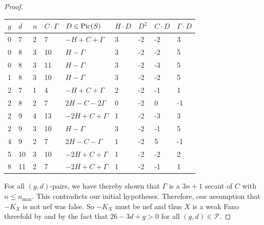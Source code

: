 \documentclass[english,11pt,reqno]{amsart}
\newcommand{\Pic}{\textup{Pic}}
\begin{document}
\begin{proof}
\begin{table}[H]
\label{table:finding_contradictory_divisors}
\begin{minipage}{\textwidth}
	\centering
	\vspace{0.5cm}
	\begin{tabular}{|l|l|l|l|l|l|l|l|l|}
		\hline
		$g$ & $d$ & $n$ & $C\cdot \Gamma$ & $D\in\Pic(S)$ & $H\cdot D$ & $D^2$ & $C\cdot D $ & $\Gamma \cdot D$ \\
		\hline
		0 & 7&2&7& $-H+C+\Gamma$ & 3 & -2 & -2 & 3\\
		\hline		
		0&8&3 & 10& $H-\Gamma$ & 3 & -2 & -2 & 5\\
		\hline 
		0&8&3 & 11& $H-\Gamma$ & 3 & -2 & -3 & 5\\
		\hline 
		1 & 8 & 3 & 10& $H-\Gamma$ & 3 & -2 & -2 & 5 \\
		\hline
		2 & 7 & 1 & 4& $-H+C+\Gamma$& 2&-2 & -1 & 1 \\
		\hline 
		2 & 8 & 2 & 7& $2H-C-2\Gamma$ & 0 & -2 & 0 & -1\\
		\hline
		2 & 9 & 4 & 13 & $-2H+C+\Gamma$ & 1 & -2 &-3 & 3 \\
		\hline 
		2 & 9 & 3 &10 &$H-\Gamma$&3&-2&-1&5\\
		\hline
		4&9&2&7&$2H-C-\Gamma$& 1 &-2&5&-1\\
		\hline
		5&10&3&10&$-2H+C+\Gamma$&1&-2&-2&2\\
		\hline 
		8&11&2&7&$-2H+C+\Gamma$ &1&-2&-1&1\\
		\hline
	\end{tabular}
\end{minipage}
\end{table}
%
For all $(g,d)$-pairs, we have thereby shown that $\Gamma$ is a $3n+1$ secant of $C$ with $n\leq n_{\max}$. This contradicts our initial hypotheses. Therefore, our assumption that $-K_X$ is not nef was false. So $-K_X$ must be nef and thus $X$ is a weak Fano threefold by  and by the fact that $26-3d+g>0$ for all $(g,d)\in \mathcal{P}$.
\end{proof}
%
\end{document}

